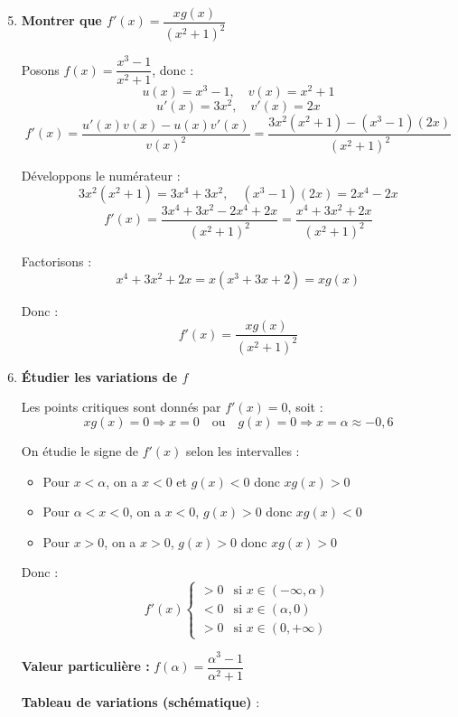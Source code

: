 \documentclass[a4paper,12pt]{article}
\begin{document}
\begin{enumerate}
\setcounter{enumi}{4}

\item \textbf{Montrer que \( f'(x) = \dfrac{x g(x)}{(x^2 + 1)^2} \)}

Posons \( f(x) = \dfrac{x^3 - 1}{x^2 + 1} \), donc :
\[
u(x) = x^3 - 1, \quad v(x) = x^2 + 1
\]
\[
u'(x) = 3x^2, \quad v'(x) = 2x
\]
\[
f'(x) = \frac{u'(x)v(x) - u(x)v'(x)}{v(x)^2} = \frac{3x^2(x^2 + 1) - (x^3 - 1)(2x)}{(x^2 + 1)^2}
\]

Développons le numérateur :
\[
3x^2(x^2 + 1) = 3x^4 + 3x^2, \quad (x^3 - 1)(2x) = 2x^4 - 2x
\]
\[
f'(x) = \frac{3x^4 + 3x^2 - 2x^4 + 2x}{(x^2 + 1)^2} = \frac{x^4 + 3x^2 + 2x}{(x^2 + 1)^2}
\]

Factorisons :
\[
x^4 + 3x^2 + 2x = x(x^3 + 3x + 2) = x g(x)
\]

Donc :
\[
\boxed{f'(x) = \frac{x g(x)}{(x^2 + 1)^2}}
\]

\vspace{0.4cm}

\item \textbf{Étudier les variations de \( f \)}

Les points critiques sont donnés par \( f'(x) = 0 \), soit :
\[
x g(x) = 0 \Rightarrow x = 0 \quad \text{ou} \quad g(x) = 0 \Rightarrow x = \alpha \approx -0{,}6
\]

On étudie le signe de \( f'(x) \) selon les intervalles :

\begin{itemize}
    \item Pour \( x < \alpha \), on a \( x < 0 \) et \( g(x) < 0 \) donc \( x g(x) > 0 \)
    \item Pour \( \alpha < x < 0 \), on a \( x < 0 \), \( g(x) > 0 \) donc \( x g(x) < 0 \)
    \item Pour \( x > 0 \), on a \( x > 0 \), \( g(x) > 0 \) donc \( x g(x) > 0 \)
\end{itemize}

Donc :
\[
f'(x)
\begin{cases}
> 0 & \text{si } x \in (-\infty, \alpha) \\
< 0 & \text{si } x \in (\alpha, 0) \\
> 0 & \text{si } x \in (0, +\infty)
\end{cases}
\]

\textbf{Valeur particulière :} \( f(\alpha) = \dfrac{\alpha^3 - 1}{\alpha^2 + 1} \)

\textbf{Tableau de variations (schématique)} :


\end{enumerate}
\end{document}
